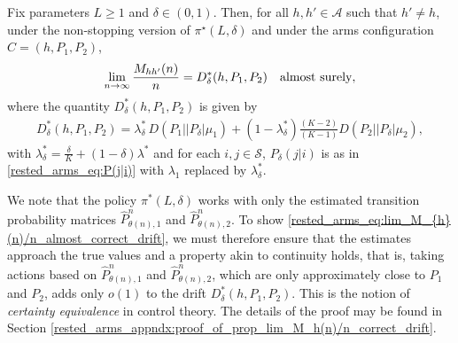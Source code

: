 \begin{prop}\label{rested_arms_prop:lim_M_h(n)/n_correct_drift}
	Fix  parameters $L\geq 1$ and $\delta\in(0,1)$. Then, for all $h, h'\in \mathcal{A}$ such that $h'\neq h$, under the non-stopping version of $\pi^{\star}(L,\delta)$ and under the arms configuration $C=(h, P_1, P_2)$,
	\begin{equation}
		\lim\limits_{n\to\infty}\frac{M_{hh'}(n)}{n}=D_\delta^*(h,P_1,P_2) \quad \text{\text{almost surely}},
		\label{rested_arms_eq:lim_M_{h}(n)/n_almost_correct_drift}
	\end{equation}
	where the quantity $D_\delta^*(h,P_1,P_2)$ is given by
\begingroup\allowdisplaybreaks\begin{align}
  D_\delta^*(h,P_1,P_2)=\lambda_\delta^*\,D(P_1||P_\delta|\mu_1)
		+(1-\lambda_\delta^*)\frac{(K-2)}{(K-1)}D(P_2||P_\delta|\mu_2),\label{rested_arms_eq:L_delta^*(h,P_1,P_2)}
    \end{align}\endgroup
    with $\lambda_\delta^*=\frac{\delta}{K}+(1-\delta)\lambda^*$
    and for each $i,j\in\mathcal{S}$, $P_\delta(j|i)$ is as in \eqref{rested_arms_eq:P(j|i)} with $\lambda_1$ replaced by $\lambda_\delta^*$.
\end{prop}
We note that the policy $\pi^*(L,\delta)$ works with only the estimated transition probability matrices $\hat{P}^n_{\theta(n),1}$ and $\hat{P}^n_{\theta(n),2}$. To show \eqref{rested_arms_eq:lim_M_{h}(n)/n_almost_correct_drift}, we must therefore ensure that the estimates approach the true values and a property akin to continuity holds, that is, taking actions based on $\hat{P}^n_{\theta(n),1}$ and $\hat{P}^n_{\theta(n),2}$, which are only approximately close to $P_1$ and $P_2$, adds only $o(1)$ to the drift $D_\delta^*(h,P_1,P_2)$. This is the notion of {\em certainty equivalence} in control theory. The details of the proof may be found in Section \ref{rested_arms_appndx:proof_of_prop_lim_M_h(n)/n_correct_drift}.

